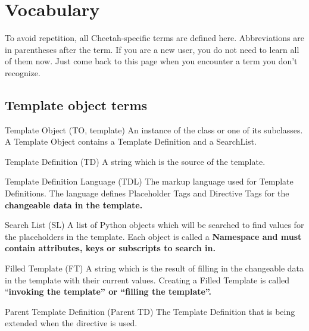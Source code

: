 \section{Vocabulary}
\label{vocabulary}

To avoid repetition, all Cheetah-specific terms are defined here.
Abbreviations are in parentheses after the term.  If you are
a new user, you do not need to learn all of them now.  Just come back to this
page when you encounter a term you don't recognize.

\subsection{Template object terms}

\begin{description}

\item{Template Object (TO, template)}  An instance of the class
      or one of its subclasses.  A 
     Template Object contains a Template Definition and a SearchList.

\item{Template Definition (TD)}  A string which is the source of the template.

\item{Template Definition Language (TDL)}  The markup language used for
     Template Definitions.  The language defines Placeholder Tags and
     Directive Tags for the \bf{changeable data} in the template.

\item{Search List (SL)}  A list of Python objects which will be searched to find
     values for the placeholders in the template.  Each object is called a
     \bf{Namespace} and must contain attributes, keys or subscripts to
     search in.  

\item{Filled Template (FT)}  A string which is the result of filling in the
     changeable data in the template with their current values.
     Creating a Filled Template is called ``\bf{invoking} the
     template'' or ``\bf{filling} the template''.

\item{Parent Template Definition (Parent TD)}  The Template Definition that is
     being extended when the  directive is used.

\end{description}


